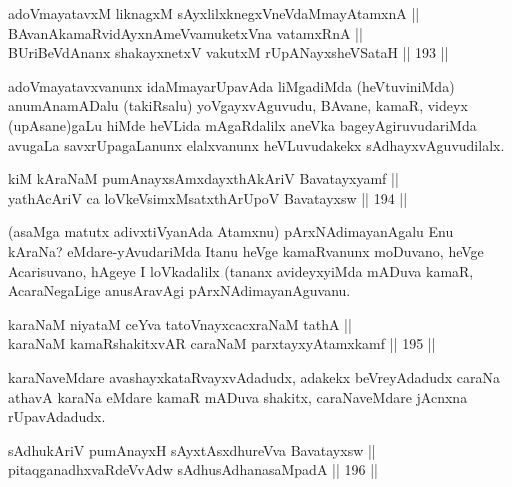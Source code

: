 \begin{shl}
\footnotemark[2]adoVmayatavxM liknagxM sAyxlilxknegxVneVdaMmayAtamxnA || \\
BAvanAkamaRvidAyxnAmeVvamuketxVna vatamxRnA || \\
BUriBeVdAnanx shakayxnetxV vakutxM rUpANayxsheVSataH \hfill || 193 ||  
\end{shl}

\begin{artha}
adoVmayatavxvanunx idaMmayarUpavAda liMgadiMda
(heVtuviniMda) anumAnamADalu (takiRsalu) yoVgayxvAguvudu, BAvane,
kamaR, videyx (upAsane)gaLu hiMde heVLida mAgaRdalilx aneVka
bageyAgiruvudariMda avugaLa savxrUpagaLanunx elalxvanunx heVLuvudakekx
sAdhayxvAguvudilalx.
\end{artha}

\begin{shl}
kiM kAraNaM pumAnayxsAmxdayxthAkAriV Bavatayxyamf || \\
yathAcAriV ca loVkeV\s simxMsatxthArUpoV Bavatayxsw \hfill || 194 ||  
\end{shl}

\begin{artha}
(asaMga matutx adivxtiVyanAda Atamxnu) pArxNAdimayanAgalu Enu
kAraNa? eMdare-yAvudariMda Itanu heVge kamaRvanunx moDuvano, heVge
Acarisuvano, hAgeye I loVkadalilx (tananx avideyxyiMda mADuva kamaR,
AcaraNegaLige anusAravAgi pArxNAdimayanAguvanu.
\end{artha}


\begin{shl}
karaNaM niyataM ceYva tatoV\s nayxcacxraNaM tathA || \\
karaNaM kamaRshakitxvAR caraNaM parxtayxyAtamxkamf \hfill || 195 ||  
\end{shl}

\begin{artha}
karaNaveMdare avashayxkataRvayxvAdadudx, adakekx beVreyAdadudx caraNa
athavA karaNa eMdare kamaR mADuva shakitx, caraNaveMdare jAcnxna
rUpavAdadudx.
\end{artha}


\begin{shl}
sAdhukAriV pumAnayxH sAyxtAsxdhureVva Bavatayxsw || \\
pitaqganadhxvaRdeVvAdw sAdhusAdhanasaMpadA \hfill || 196 ||  
\end{shl}

